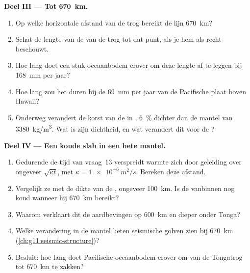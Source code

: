 \begin{problem}
\medskip
\noindent\textbf{Deel III --- Tot \qty{670}{km}.}
\begin{enumerate}[resume]
  \item Op welke horizontale afstand van de trog bereikt de lijn
        \qty{670}{km}?
  \item Schat de lengte van de  van de trog tot dat punt,
        als je hem als recht beschouwt.
  \item Hoe lang doet een stuk oceaanbodem erover om deze lengte af te leggen bij
        \qty{168}{mm} per jaar?
  \item Hoe lang zou het duren bij de \qty{69}{mm} per jaar van de Pacifische
        plaat boven Hawaii?
  \item Onderweg verandert de korst van de  in ,
        \qty{6}{\percent} dichter dan de mantel van \qty{3380}{kg/m^3}. Wat
        is zijn dichtheid, en wat verandert dit voor de ?
\end{enumerate}

\medskip
\noindent\textbf{Deel IV --- Een koude slab in een hete mantel.}
\begin{enumerate}[resume]
  \item Gedurende de tijd van vraag~13 verspreidt warmte zich door geleiding over ongeveer
        $\sqrt{\kappa t}$, met $\kappa = \qty{1e-6}{m^2/s}$. Bereken deze
        afstand.
  \item Vergelijk ze met de dikte van de , ongeveer \qty{100}{km}. Is
        de  vanbinnen nog koud wanneer hij \qty{670}{km} bereikt?
  \item Waarom verklaart dit de aardbevingen op \qty{600}{km} en dieper
        onder Tonga?
  \item Welke verandering in de mantel lieten seismische golven zien bij
        \qty{670}{km} (\cref{ch:g11:seismic-structure})?
  \item Besluit: hoe lang doet Pacifische oceaanbodem erover om van de
        Tongatrog tot \qty{670}{km} te zakken?
\end{enumerate}
\end{problem}
